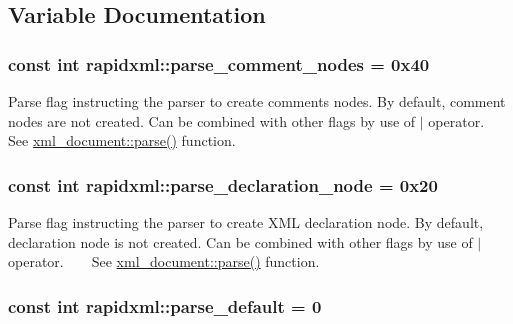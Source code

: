\subsection{Variable Documentation}
\hypertarget{namespacerapidxml_ae093dd49e2f59fa39eee95f1a6568e32}{
\subsubsection[{parse\+\_\+comment\+\_\+nodes}]{\setlength{\rightskip}{0pt plus 5cm}const int rapidxml\+::parse\+\_\+comment\+\_\+nodes = 0x40}}\label{namespacerapidxml_ae093dd49e2f59fa39eee95f1a6568e32}
Parse flag instructing the parser to create comments nodes. By default, comment nodes are not created. Can be combined with other flags by use of $\vert$ operator. ~\newline
~\newline
 See \hyperlink{singletonrapidxml_1_1xml__document_ac6e73ff9ac323bf5a370c38feb03a6b1}{xml\+\_\+document\+::parse()} function. \hypertarget{namespacerapidxml_a999d782659513f8015ea4236e3204c42}{
\subsubsection[{parse\+\_\+declaration\+\_\+node}]{\setlength{\rightskip}{0pt plus 5cm}const int rapidxml\+::parse\+\_\+declaration\+\_\+node = 0x20}}\label{namespacerapidxml_a999d782659513f8015ea4236e3204c42}
Parse flag instructing the parser to create X\+M\+L declaration node. By default, declaration node is not created. Can be combined with other flags by use of $\vert$ operator. ~\newline
~\newline
 See \hyperlink{singletonrapidxml_1_1xml__document_ac6e73ff9ac323bf5a370c38feb03a6b1}{xml\+\_\+document\+::parse()} function. \hypertarget{namespacerapidxml_acf4edf952f59eb1b6124ea37ad7da3ab}{
\subsubsection[{parse\+\_\+default}]{\setlength{\rightskip}{0pt plus 5cm}const int rapidxml\+::parse\+\_\+default = 0}}\label{namespacerapidxml_acf4edf952f59eb1b6124ea37ad7da3ab}
